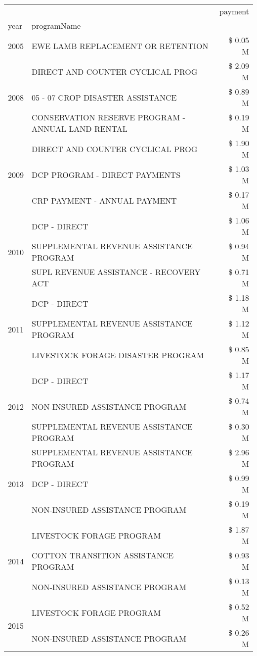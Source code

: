 \begin{tabular}{llr}
\toprule
 &  & payment \\
year & programName &  \\
\midrule
2005 & EWE LAMB REPLACEMENT OR RETENTION & \$ 0.05 M \\
\cline{1-3}
\multirow[t]{3}{*}{2008} & DIRECT AND COUNTER CYCLICAL PROG & \$ 2.09 M \\
 & 05 - 07 CROP DISASTER ASSISTANCE & \$ 0.89 M \\
 & CONSERVATION RESERVE PROGRAM - ANNUAL LAND RENTAL & \$ 0.19 M \\
\cline{1-3}
\multirow[t]{3}{*}{2009} & DIRECT AND COUNTER CYCLICAL PROG & \$ 1.90 M \\
 & DCP PROGRAM - DIRECT PAYMENTS & \$ 1.03 M \\
 & CRP PAYMENT - ANNUAL PAYMENT & \$ 0.17 M \\
\cline{1-3}
\multirow[t]{3}{*}{2010} & DCP - DIRECT & \$ 1.06 M \\
 & SUPPLEMENTAL REVENUE ASSISTANCE PROGRAM & \$ 0.94 M \\
 & SUPL REVENUE ASSISTANCE - RECOVERY ACT & \$ 0.71 M \\
\cline{1-3}
\multirow[t]{3}{*}{2011} & DCP - DIRECT & \$ 1.18 M \\
 & SUPPLEMENTAL REVENUE ASSISTANCE PROGRAM & \$ 1.12 M \\
 & LIVESTOCK FORAGE DISASTER PROGRAM & \$ 0.85 M \\
\cline{1-3}
\multirow[t]{3}{*}{2012} & DCP - DIRECT & \$ 1.17 M \\
 & NON-INSURED ASSISTANCE PROGRAM & \$ 0.74 M \\
 & SUPPLEMENTAL REVENUE ASSISTANCE PROGRAM & \$ 0.30 M \\
\cline{1-3}
\multirow[t]{3}{*}{2013} & SUPPLEMENTAL REVENUE ASSISTANCE PROGRAM & \$ 2.96 M \\
 & DCP - DIRECT & \$ 0.99 M \\
 & NON-INSURED ASSISTANCE PROGRAM & \$ 0.19 M \\
\cline{1-3}
\multirow[t]{3}{*}{2014} & LIVESTOCK FORAGE PROGRAM & \$ 1.87 M \\
 & COTTON TRANSITION ASSISTANCE PROGRAM & \$ 0.93 M \\
 & NON-INSURED ASSISTANCE PROGRAM & \$ 0.13 M \\
\cline{1-3}
\multirow[t]{3}{*}{2015} & LIVESTOCK FORAGE PROGRAM & \$ 0.52 M \\
 & NON-INSURED ASSISTANCE PROGRAM & \$ 0.26 M \\

\end{tabular}
